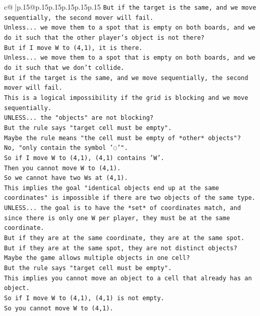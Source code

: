 \documentclass{article}
\begin{document}
{\begin{supertabular}{c@{$\;$}|p{.15\linewidth}@{}p{.15\linewidth}p{.15\linewidth}p{.15\linewidth}p{.15\linewidth}p{.15\linewidth}}
{{{\texttt{But if the target is the same, and we move sequentially, the second mover will fail.} \\
\texttt{Unless... we move them to a spot that is empty on both boards, and we do it such that the other player's object is not there?} \\
\texttt{But if I move W to (4,1), it is there.} \\
\texttt{Unless... we move them to a spot that is empty on both boards, and we do it such that we don't collide.} \\
\texttt{But if the target is the same, and we move sequentially, the second mover will fail.} \\
\texttt{This is a logical impossibility if the grid is blocking and we move sequentially.} \\
\texttt{UNLESS... the "objects" are not blocking?} \\
\texttt{But the rule says "target cell must be empty".} \\
\texttt{Maybe the rule means "the cell must be empty of *other* objects"?} \\
\texttt{No, "only contain the symbol '◌'".} \\
\texttt{So if I move W to (4,1), (4,1) contains 'W'.} \\
\texttt{Then you cannot move W to (4,1).} \\
\texttt{So we cannot have two Ws at (4,1).} \\
\texttt{This implies the goal "identical objects end up at the same coordinates" is impossible if there are two objects of the same type.} \\
\texttt{UNLESS... the goal is to have the *set* of coordinates match, and since there is only one W per player, they must be at the same coordinate.} \\
\texttt{But if they are at the same coordinate, they are at the same spot.} \\
\texttt{But if they are at the same spot, they are not distinct objects?} \\
\texttt{Maybe the game allows multiple objects in one cell?} \\
\texttt{But the rule says "target cell must be empty".} \\
\texttt{This implies you cannot move an object to a cell that already has an object.} \\
\texttt{So if I move W to (4,1), (4,1) is not empty.} \\
\texttt{So you cannot move W to (4,1).} \\
}}}
\end{supertabular}}
\end{document}
